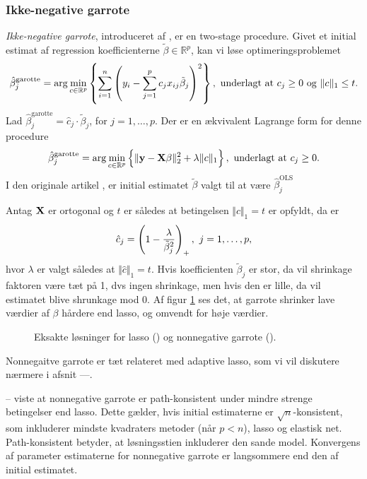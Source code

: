 \subsubsection{Ikke-negative garrote}
\textit{Ikke-negative garrote}, introduceret af \citep{nonnegative_garrote}, er en two-stage procedure. 
Givet et initial estimat af regression koefficienterne \(\tilde{\beta} \in \mathbb{R}^p\), kan vi løse optimeringsproblemet
\begin{align}
\hat{\beta}_j^\text{garotte} = \arg \min_{c \in \mathbb{R}^p}  \cbr{ \sum_{i=1}^n \del{y_i - \sum_{j=1}^p c_j x_{ij} \tilde{\beta}_j}^2}, \ \text{underlagt at } c_j \geq 0 \text{ og } \Vert c \Vert_1 \leq t. \label{eq:2.19}
\end{align}
Lad \(\hat{\beta}_j^\text{garotte} = \hat{c}_j \cdot \tilde{\beta}_j\), for \(j = 1, \ldots, p\).
Der er en ækvivalent Lagrange form for denne procedure
\begin{align*}
\hat{\beta}_j^\text{garotte} = \arg \min_{c \in \mathbb{R}^p}  \cbr{\Vert \y - \X \beta \Vert_2^2 + \lambda \Vert c \Vert_1}, \ \text{underlagt at } c_j \geq 0.
\end{align*}
I den originale artikel \citep{nonnegative_garrote}, er initial estimatet \(\tilde{\beta}\) valgt til at være \(\hat{\beta}_j^\text{OLS}\)

Antag \(\mathbf{X}\) er ortogonal og \(t\) er således at betingelsen \(\Vert c \Vert_1 = t\) er opfyldt, da er
\begin{align*}
\hat{c}_j = \del{1 - \frac{\lambda}{\tilde{\beta}_j^2}}_+, \ j = 1, \ldots, p,
\end{align*}
hvor \(\lambda\) er valgt således at \(\Vert \hat{c} \Vert_1 = t\).
Hvis koefficienten \(\tilde{\beta}_j\) er stor, da vil shrinkage faktoren være tæt på 1, dvs ingen shrinkage, men hvis den er lille, da vil estimatet blive shrunkage mod 0.
Af figur \ref{fig:nonnegative_garrote} ses det, at garrote shrinker lave værdier af \(\beta\) hårdere end lasso, og omvendt for høje værdier.
%
\begin{figure}[H]
\centering
\scalebox{0.8}{}
\caption[optional short text]{Eksakte løsninger for lasso () og nonnegative garrote ().} \label{fig:nonnegative_garrote}
\end{figure}
%
Nonnegaitve garrote er tæt relateret med adaptive lasso, som vi vil diskutere nærmere i afsnit ---.

-- viste at nonnegative garrote er path-konsistent under mindre strenge betingelser end lasso.
Dette gælder, hvis initial estimaterne er \(\sqrt{n}\)-konsistent, som inkluderer mindste kvadraters metoder (når \(p < n\)), lasso og elastisk net.
Path-konsistent betyder, at løsningsstien inkluderer den sande model.
Konvergens af parameter estimaterne for nonnegative garrote er langsommere end den af initial estimatet.
\newpage
 